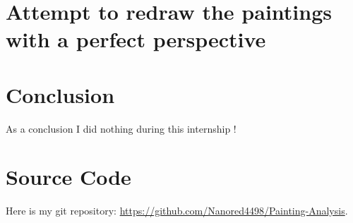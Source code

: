 \documentclass[11pt]{article}
\begin{document}
	\section{Attempt to redraw the paintings with a perfect perspective}

	\section{Conclusion}
	
	As a conclusion I did nothing during this internship !
	
	\appendix
	
	\section{Source Code}
	
	Here is my git repository: \url{https://github.com/Nanored4498/Painting-Analysis}.

	
	
	
\end{document}
